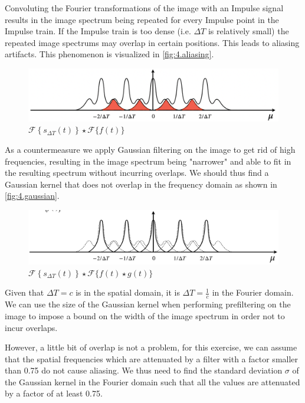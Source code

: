 \documentclass[tikz,14pt,fleqn]{article}
\begin{document}
Convoluting the Fourier transformations of the image with an Impulse signal results in the image spectrum being repeated for every Impulse point in the Impulse train. If the Impulse train is too dense (i.e. $\Delta T$ is relatively small) the repeated image spectrums may overlap in certain positions. This leads to aliasing artifacts. This phenomenon is visualized in \autoref{fig:4.aliasing}.
\begin{figure}[H]
    \centering
    \includegraphics[width=0.8\linewidth]{fig/3.aliasing.png}
    \caption{$\mathscr{F}\left\{s_{\Delta T}(t)\right\} \star \mathscr{F}\{f(t)\}$}
    \label{fig:4.aliasing}
\end{figure}
As a countermeasure we apply Gaussian filtering on the image to get rid of high frequencies, resulting in the image spectrum being "narrower" and able to fit in the resulting spectrum without incurring overlaps.
We should thus find a Gaussian kernel that does not overlap in the frequency domain as shown in \autoref{fig:4.gaussian}.
\begin{figure}[H]
    \centering
    \includegraphics[width=0.8\linewidth]{fig/3.aliasing_gaussians.png}
    \caption{$\mathscr{F}\left\{s_{\Delta T}(t)\right\} \star \mathscr{F}\{f(t)\star g(t)\}$}
    \label{fig:4.gaussian}
\end{figure}


Given that $\Delta T = c$ is in the spatial domain, it is $\Delta T = \frac{1}{c}$ in the Fourier domain. We can use the size of the Gaussian kernel when performing prefiltering on the image to impose a bound on the width of the image spectrum in order not to incur overlaps. 

However, a little bit of overlap is not a problem, for this exercise, we can assume that the spatial frequencies which are attenuated by a filter with a factor smaller than 0.75 do not cause aliasing.
We thus need to find the standard deviation $\sigma$ of the Gaussian kernel in the Fourier domain such that all the values are attenuated by a factor of at least 0.75.
\end{document}
